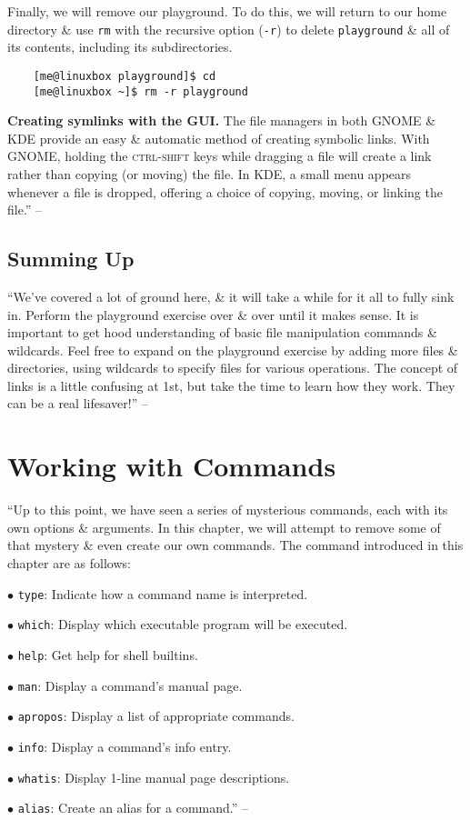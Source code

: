 \documentclass[oneside]{book}
\numberwithin{equation}{section}
\begin{document}
Finally, we will remove our playground. To do this, we will return to our home directory \& use \texttt{rm} with the recursive option (\texttt{-r}) to delete \texttt{playground} \& all of its contents, including its subdirectories.
\begin{verbatim}
	[me@linuxbox playground]$ cd
	[me@linuxbox ~]$ rm -r playground
\end{verbatim}
\textbf{Creating symlinks with the GUI.} The file managers in both GNOME \& KDE provide an easy \& automatic method of creating symbolic links. With GNOME, holding the \textsc{ctrl-shift} keys while dragging a file will create a link rather than copying (or moving) the file. In KDE, a small menu appears whenever a file is dropped, offering a choice of copying, moving, or linking the file.'' -- \cite[pp. 80--82]{Shotts2019}

\subsection{Summing Up}
``We've covered a lot of ground here, \& it will take a while for it all to fully sink in. Perform the playground exercise over \& over until it makes sense. It is important to get hood understanding of basic file manipulation commands \& wildcards. Feel free to expand on the playground exercise by adding more files \& directories, using wildcards to specify files for various operations. The concept of links is a little confusing at 1st, but take the time to learn how they work. They can be a real lifesaver!'' -- \cite[p. 82]{Shotts2019}


\section{Working with Commands}
``Up to this point, we have seen a series of mysterious commands, each with its own options \& arguments. In this chapter, we will attempt to remove some of that mystery \& even create our own commands. The command introduced in this chapter are as follows:
\begin{enumerate*}
	\item[$\bullet$] \texttt{type}: Indicate how a command name is interpreted.
	\item[$\bullet$] \texttt{which}: Display which executable program will be executed.
	\item[$\bullet$] \texttt{help}: Get help for shell builtins.
	\item[$\bullet$] \texttt{man}: Display a command's manual page.
	\item[$\bullet$] \texttt{apropos}: Display a list of appropriate commands.
	\item[$\bullet$] \texttt{info}: Display a command's info entry.
	\item[$\bullet$] \texttt{whatis}: Display 1-line manual page descriptions.
	\item[$\bullet$] \texttt{alias}: Create an alias for a command.'' -- \cite[p. 83]{Shotts2019}
\end{enumerate*}
\end{document}
